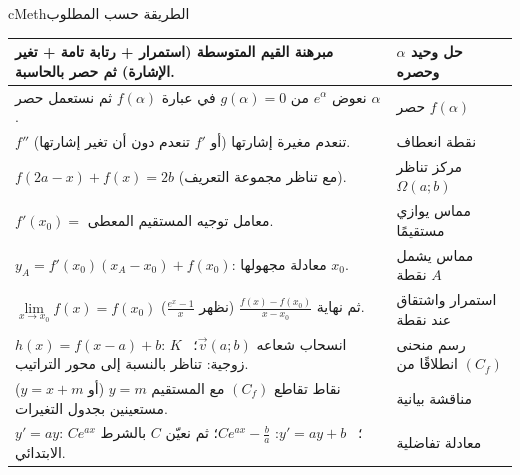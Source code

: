 \documentclass[12pt,a4paper]{article}
\newenvironment{BOX}[2]{\begin{otherlanguage}{english}\begin{arbox}{#1}{#2}}{\end{arbox}\end{otherlanguage}}
\begin{document}
\begin{BOX}{cMeth}{الطريقة حسب المطلوب}
\begin{center}
\begin{tabular}{|p{}|p{}|}
مبرهنة القيم المتوسطة (استمرار + رتابة تامة + تغير الإشارة) ثم حصر بالحاسبة. & حل وحيد $\alpha$ وحصره\\\hline
نعوض $e^{\alpha}$ من $g(\alpha)=0$ في عبارة $f(\alpha)$ ثم نستعمل حصر $\alpha$. & حصر $f(\alpha)$\\\hline
$f''$ تنعدم مغيرة إشارتها (أو $f'$ تنعدم دون أن تغير إشارتها). & نقطة انعطاف\\\hline
$f(2a-x)+f(x)=2b$ (مع تناظر مجموعة التعريف). & مركز تناظر $\Omega(a;b)$\\\hline
$f'(x_0)=$ معامل توجيه المستقيم المعطى. & مماس يوازي مستقيمًا\\\hline
$y_A=f'(x_0)(x_A-x_0)+f(x_0)$: معادلة مجهولها $x_0$. & مماس يشمل نقطة $A$\\\hline
$\lim\limits_{x\to x_0}f(x)=f(x_0)$ ثم نهاية $\frac{f(x)-f(x_0)}{x-x_0}$ (نظهر $\frac{e^{x}-1}{x}$). & استمرار واشتقاق عند نقطة\\\hline
$h(x)=f(x-a)+b$: انسحاب شعاعه $\vec{v}(a;b)$؛ \ $K$ زوجية: تناظر بالنسبة إلى محور التراتيب. & رسم منحنى انطلاقًا من $(C_f)$\\\hline
نقاط تقاطع $(C_f)$ مع المستقيم $y=m$ (أو $y=x+m$) مستعينين بجدول التغيرات. & مناقشة بيانية\\\hline
$y'=ay$: $Ce^{ax}$ ؛ \ $y'=ay+b$: $Ce^{ax}-\frac{b}{a}$؛ ثم نعيّن $C$ بالشرط الابتدائي. & معادلة تفاضلية\\\hline
\end{tabular}
\end{center}
\end{BOX}
\end{document}
